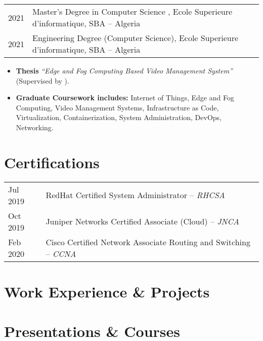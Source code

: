 \documentclass{cv}
\begin{document}
\begin{tabular}{l l}
  {2021} & {\hspace{1.3cm }Master's Degree in Computer Science , Ecole Superieure d'informatique, SBA -- Algeria} \\
  {2021} & {\hspace{1.3cm }Engineering Degree (Computer Science), Ecole Superieure d'informatique, SBA -- Algeria} \\
\end{tabular}
\begin{itemize}
  \item \textbf{Thesis} \emph{``Edge and Fog Computing Based Video Management System''} \footnotesize{(Supervised by \rhn)}\normalsize.
  \item \normalsize{\textbf{Graduate Coursework includes:}} \small {Internet of Things, Edge and Fog Computing, Video Management Systems, Infrastructure as Code, Virtualization, Containerization, System Administration, DevOps, Networking}. 
\end{itemize}
\section{Certifications}
\begin{tabular}{l l}
  {Jul 2019} & {\hspace{.7cm }RedHat Certified System Administrator -- \emph{RHCSA}} \\
  {Oct 2019} & {\hspace{.7cm }Juniper Networks Certified Associate (Cloud) -- \emph{JNCA}}  \\
  {Feb 2020} & {\hspace{.7cm }Cisco Certified Network Associate Routing and Switching -- \emph{CCNA}} \\
\end{tabular}

\section{Work Experience \& Projects}
\section{Presentations \& Courses}
\end{document}
